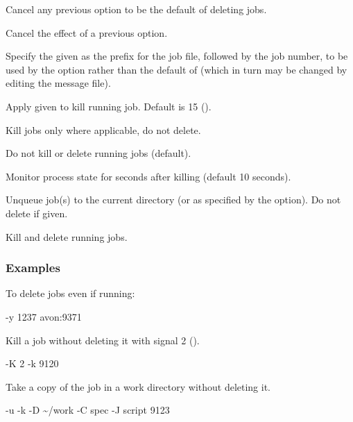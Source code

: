 
Cancel any previous  option to be the default of deleting jobs.


Cancel the effect of a previous  option.


Specify the given  as the prefix for the job file, followed by the job number, to be used by the
 option rather than the default of  (which in turn may be changed by editing the
message file).


Apply  given to kill running job. Default is 15 ().


Kill jobs only where applicable, do not delete.


Do not kill or delete running jobs (default).


Monitor process state for  seconds after killing (default 10 seconds).


Unqueue job(s) to the current directory (or as specified by the  option). Do not delete if  given.


Kill and delete running jobs.


\subsubsection{Examples}
To delete jobs even if running:

\begin{expara}

\BtjdelName{} -y 1237 avon:9371

\end{expara}

Kill a job without deleting it with signal 2
().

\begin{expara}

\BtjdelName{} -K 2 -k 9120

\end{expara}

Take a copy of the job in a work directory without deleting it.

\begin{expara}

\BtjdelName{} -u -k -D \~{}/work -C spec -J script 9123

\end{expara}

